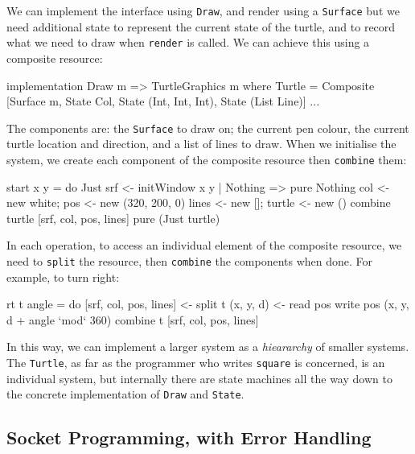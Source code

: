 We can implement the interface using \texttt{Draw}, and render using
a \texttt{Surface} but we need additional state to represent the current
state of the turtle, and to record what we need to draw when \texttt{render}
is called. We can achieve this using a composite resource:

\small
\begin{code}
implementation Draw m => TurtleGraphics m where
  Turtle = Composite [Surface {m}, State Col, State (Int, Int, Int), 
                      State (List Line)] 
  ...
\end{code}
\normalsize

The components are: the \texttt{Surface} to draw on; the current pen colour,
the current turtle location and direction, and a list
of lines to draw. When we initialise the system, we create each component
of the composite resource then \texttt{combine} them:
  
\small
\begin{code}
start x y = do Just srf <- initWindow x y | Nothing => pure Nothing
               col <- new white; pos <- new (320, 200, 0)
               lines <- new []; turtle <- new ()
               combine turtle [srf, col, pos, lines]
               pure (Just turtle)
\end{code}
\normalsize

In each operation, to access an individual element of the composite resource,
we need to \texttt{split} the resource, then \texttt{combine} the components
when done. For example, to turn right:

\small
\begin{code}
rt t angle = do [srf, col, pos, lines] <- split t
                (x, y, d) <- read pos
                write pos (x, y, d + angle `mod` 360)
                combine t [srf, col, pos, lines]
\end{code}
\normalsize

In this way, we can implement a larger system as a \emph{hieararchy} of
smaller systems. The \texttt{Turtle}, as far as the programmer who writes
\texttt{square} is concerned, is an individual system, but internally there
are state machines all the way down to the concrete implementation of
\texttt{Draw} and \texttt{State}.

\subsection{Socket Programming, with Error Handling}

